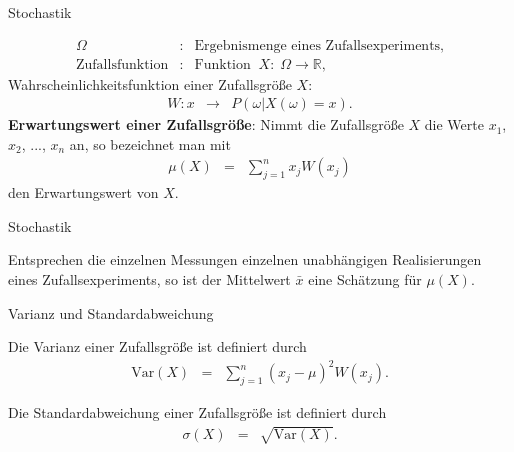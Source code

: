 \documentclass[german]{beamer}
\newcommand{\bq}{\begin{eqnarray*}}
\newcommand{\eq}{\end{eqnarray*}}
\begin{document}
\frame{\sectionpage}

\begin{frame}{Stochastik}

\begin{definition}
\bq
\Omega & : & \mbox{Ergebnismenge eines Zufallsexperiments},
 \nonumber \\
\mbox{Zufallsfunktion} & : & \mbox{Funktion} \;\; X: \; \Omega \rightarrow {\mathbb R},
\eq
Wahrscheinlichkeitsfunktion einer Zufallsgr\"o{\ss}e $X$:
\bq
 W : x & \rightarrow & P\left( \omega | X(\omega) = x \right).
\eq
{\bf Erwartungswert einer Zufallsgr\"o{\ss}e}: Nimmt die Zufallsgr\"o{\ss}e $X$ die Werte
$x_1$, $x_2$, ..., $x_n$ an, so bezeichnet man mit
\bq
 \mu\left(X \right) & = & \sum\limits_{j=1}^n x_j W(x_j)
\eq
den Erwartungswert von $X$.
\end{definition}

\end{frame}

\begin{frame}{Stochastik}

\begin{theorem}
Entsprechen die einzelnen Messungen einzelnen unabh\"angigen Realisierungen eines
Zufallsexperiments, so ist der Mittelwert $\bar{x}$ eine Sch\"atzung f\"ur $\mu(X)$.
\end{theorem}

\end{frame}

\begin{frame}{Varianz und Standardabweichung}

\begin{definition}
Die Varianz einer Zufallsgr\"o{\ss}e ist definiert durch
\bq
 \mbox{Var}(X) & = & \sum\limits_{j=1}^n \left( x_j - \mu \right)^2 W(x_j).
\eq
\end{definition}

\begin{definition}
Die Standardabweichung einer Zufallsgr\"o{\ss}e ist definiert durch
\bq
 \sigma(X) & = & \sqrt{\mbox{Var}(X)}.
\eq
\end{definition}

\end{frame}
\end{document}
